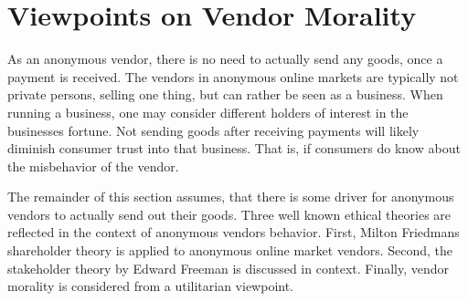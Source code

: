 \section{Viewpoints on Vendor Morality}

As an anonymous vendor, there is no need to actually send any goods, once a payment is received. The vendors in anonymous online markets are typically not private persons, selling one thing, but can rather be seen as a business\cite{silkroad2013}. When running a business, one may consider different holders of interest in the businesses fortune. Not sending goods after receiving payments will likely diminish consumer trust into that business. That is, if consumers do know about the misbehavior of the vendor.

The remainder of this section assumes, that there is some driver for anonymous vendors to actually send out their goods. Three well known ethical theories are reflected in the context of anonymous vendors behavior. First, Milton Friedmans shareholder theory is applied to anonymous online market vendors. Second, the stakeholder theory by Edward Freeman is discussed in context. Finally, vendor morality is considered from a utilitarian viewpoint.




